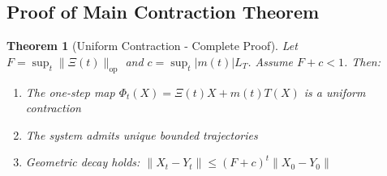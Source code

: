 \documentclass[11pt,a4paper]{article}
\newtheorem{theorem}{Theorem}
\begin{document}
\subsection{Proof of Main Contraction Theorem}

\begin{theorem}[Uniform Contraction - Complete Proof]
\label{thm:contraction-detailed}
Let \(F = \sup_t \|\Xi(t)\|_{\mathrm{op}}\) and \(c = \sup_t |m(t)| L_T\). Assume \(F + c < 1\). Then:
\begin{enumerate}
\item The one-step map \(\Phi_t(X) = \Xi(t)X + m(t)T(X)\) is a uniform contraction
\item The system admits unique bounded trajectories
\item Geometric decay holds: \(\|X_t - Y_t\| \leq (F+c)^t \|X_0 - Y_0\|\)
\end{enumerate}
\end{theorem}
\end{document}
